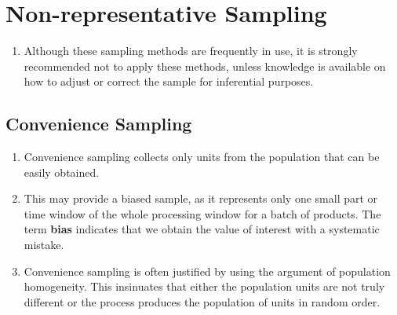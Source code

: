 \section{Non-representative Sampling \cite{statistics/book/Statistics-for-Data-Scientists/Maurits-Kaptein}}\label{Sampling Plans/Non-representative Sampling}

\begin{enumerate}
    \item Although these sampling methods are frequently in use, it is strongly recommended not to apply these methods, unless knowledge is available on how to adjust or correct the sample for inferential purposes.
    \hfill \cite{statistics/book/Statistics-for-Data-Scientists/Maurits-Kaptein}
\end{enumerate}

\subsection{Convenience Sampling \cite{statistics/book/Statistics-for-Data-Scientists/Maurits-Kaptein}}\label{Sampling Plans/Non-representative Sampling/Convenience Sampling}

\begin{enumerate}
    \item Convenience sampling collects only units from the population that can be easily obtained.
    \hfill \cite{statistics/book/Statistics-for-Data-Scientists/Maurits-Kaptein}

    \item This may provide a biased sample, as it represents only one small part or time window of the whole processing window for a batch of products. The term \textbf{bias}\label{Sampling Plans/Non-representative Sampling/Convenience Sampling/bias} indicates that we obtain the value of interest with a systematic mistake.
    \hfill \cite{statistics/book/Statistics-for-Data-Scientists/Maurits-Kaptein}

    \item  Convenience sampling is often justified by using the argument of population homogeneity. This insinuates that either the population units are not truly different or the process produces the population of units in random order. 
    \hfill \cite{statistics/book/Statistics-for-Data-Scientists/Maurits-Kaptein}

    
\end{enumerate}


















